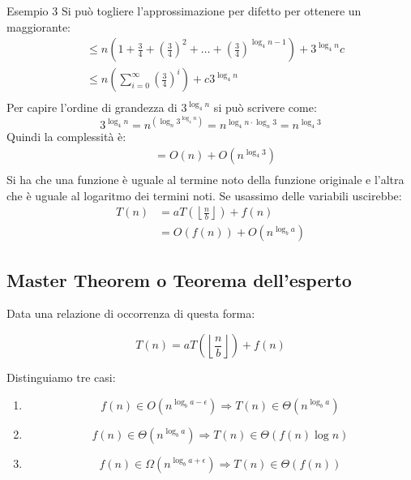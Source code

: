 \documentclass[a4paper]{article}
\begin{document}
\begin{examplebox}{Esempio 3}
  Si può togliere l'approssimazione per difetto per ottenere un maggiorante:
  \[
  \begin{aligned}
    & \le n \left( 1 + \frac{3}{4} + \left( \frac{3}{4} \right)^2 + \ldots +
    \left( \frac{3}{4} \right)^{\log_4 n-1} \right) + 3^{\log_4 n} c\\
    & \le n \left( \sum_{i=0}^{\infty} \left( \frac{3}{4} \right)^i \right) + c 3^{\log_4 n}\\
  \end{aligned}
  \]
  Per capire l'ordine di grandezza di \( 3^{\log_4 n} \) si può scrivere come:
  \[
    3^{\log_4 n} = n^{\left( \log_n 3^{\log_4 n} \right) } = n^{\log_4 n \cdot \log_n 3}
    = n^{\log_4 3}
  \]
  Quindi la complessità è:
  \[
  \begin{aligned}
    & = O(n) + O(n^{\log_4 3})\\
  \end{aligned}
  \]
  Si ha che una funzione è uguale al termine noto della funzione originale e l'altra
  che è uguale al logaritmo dei termini noti. Se usassimo delle variabili uscirebbe:
  \[
    \begin{aligned}
      T(n) & = a T \left( \left\lfloor \frac{n}{b} \right\rfloor \right) + f(n)\\
           & = O(f(n)) + O(n^{\log_b a})
    \end{aligned}
  \]
\end{examplebox}



\subsection{Master Theorem o Teorema dell'esperto}

Data una relazione di occorrenza di questa forma:

\[T(n) = a T \left( \left\lfloor \frac{n}{b} \right\rfloor \right) + f(n)\]

Distinguiamo tre casi:

\begin{enumerate}
    \item \[f(n) \in O(n^{\log_ba - \epsilon}) \Longrightarrow T(n) \in \Theta(n^{\log_ba})\]
    \item \[f(n) \in \Theta(n^{\log_ba}) \Longrightarrow T(n) \in \Theta(f(n)\log n)\]
    \item \[f(n) \in \Omega(n^{\log_ba + \epsilon} ) \Longrightarrow T(n) \in \Theta(f(n))\]
\end{enumerate}
\end{document}
